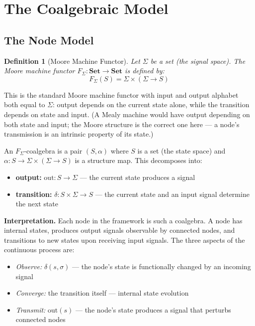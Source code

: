 \documentclass[12pt,a4paper]{article}
\newtheorem{definition}{Definition}
\begin{document}
\section{The Coalgebraic Model}
\label{sec:coalgebraic-model}

\subsection{The Node Model}
\label{sec:node-model}

\begin{definition}[Moore Machine Functor]
\label{def:moore-functor}
Let $\Sigma$ be a set (the signal space). The \emph{Moore machine functor} $F_\Sigma : \mathbf{Set} \to \mathbf{Set}$ is defined by:
$$F_\Sigma(S) = \Sigma \times (\Sigma \to S)$$
\end{definition}

This is the standard Moore machine functor with input and output alphabet both equal to $\Sigma$: output depends on the current state alone, while the transition depends on state and input. (A Mealy machine would have output depending on both state and input; the Moore structure is the correct one here --- a node's transmission is an intrinsic property of its state.)

An $F_\Sigma$-coalgebra is a pair $(S, \alpha)$ where $S$ is a set (the state space) and $\alpha : S \to \Sigma \times (\Sigma \to S)$ is a structure map. This decomposes into:

\begin{itemize}
  \item \textbf{output:} $\text{out} : S \to \Sigma$ --- the current state produces a signal
  \item \textbf{transition:} $\delta : S \times \Sigma \to S$ --- the current state and an input signal determine the next state
\end{itemize}

\textbf{Interpretation.} Each node in the framework is such a coalgebra. A node has internal states, produces output signals observable by connected nodes, and transitions to new states upon receiving input signals. The three aspects of the continuous process are:

\begin{itemize}
  \item \emph{Observe:} $\delta(s, \sigma)$ --- the node's state is functionally changed by an incoming signal
  \item \emph{Converge:} the transition itself --- internal state evolution
  \item \emph{Transmit:} $\text{out}(s)$ --- the node's state produces a signal that perturbs connected nodes
\end{itemize}
\end{document}

